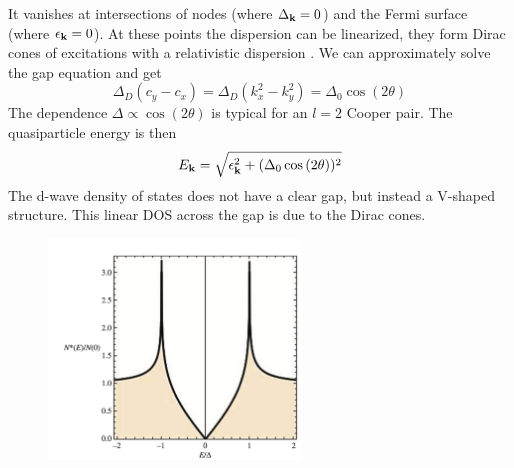 It vanishes at intersections of nodes (where \(\Delta_{\mathbf{k}} = 0\)) and the Fermi surface (where \(\epsilon_{\mathbf{k}} = 0\)).
At these points the dispersion can be linearized, they form Dirac cones of excitations with a relativistic dispersion .
We can approximately solve the gap equation and get
\begin{equation}
    \Delta_D (c_y - c_x) = \Delta_D (k_x^2 - k_y^2) = \Delta_0 \cos{(2\theta)}
\end{equation}
The dependence \(\Delta \propto \cos{(2\theta)}\) is typical for an \(l=2\) Cooper pair. 
The quasiparticle energy is then
\begin{equation}
    E_{\mathbf{k}} = \sqrt{\epsilon_{\mathbf{k}}^2 + (\Delta_0 \cos{(2\theta)})^2}
\end{equation}
The d-wave density of states does not have a clear gap, but instead a V-shaped structure.
This linear DOS across the gap is due to the Dirac cones.
\begin{figure}[ht]
    \centering
    \includegraphics[width=0.6\textwidth]{notes/images/density of states d-wave}
    \caption{}
    \label{fig:d-wave density of states}
\end{figure}
